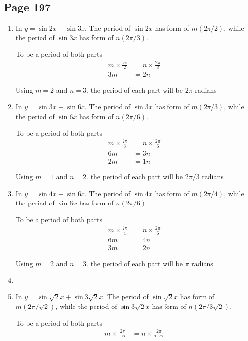 \documentclass{article}
\newenvironment{solutions}[1]
{\subsection*{#1}
 \begin{enumerate}[leftmargin=1.5em]}
{\end{enumerate}}
\newcommand{\solution}{\item}
\begin{document}
\begin{solutions}{Page 197}
\solution
In $y=\sin 2x + \sin 3x$. The period of $\sin 2x$ has form of $m(2\pi/2)$, while the period of $\sin 3x$ has form of $n(2\pi/3)$.

To be a period of both parts
\begin{align*}
    m\times \frac{2\pi}{2} &= n\times \frac{2\pi}{3}\\
                         3m  &= 2n
\end{align*}

Using $m=2$ and $n=3$. the period of each part will be $2\pi$ radians

\solution
In $y=\sin 3x + \sin 6x$. The period of $\sin 3x$ has form of $m(2\pi/3)$, while the period of $\sin 6x$ has form of $n(2\pi/6)$.

To be a period of both parts
\begin{align*}
    m\times \frac{2\pi}{3} &= n\times \frac{2\pi}{6}\\
                         6m  &= 3n\\
                         2m &= 1n
\end{align*}

Using $m=1$ and $n=2$. the period of each part will be $2\pi/3$ radians

\solution
In $y=\sin 4x + \sin 6x$. The period of $\sin 4x$ has form of $m(2\pi/4)$, while the period of $\sin 6x$ has form of $n(2\pi/6)$.

To be a period of both parts
\begin{align*}
    m\times \frac{2\pi}{4} &= n\times \frac{2\pi}{6}\\
                         6m  &= 4n\\
                         3m &= 2n
\end{align*}

Using $m=2$ and $n=3$. the period of each part will be $\pi$ radians

\solution
\solution
In $y=\sin \sqrt{2}x + \sin 3\sqrt{2}x$. The period of $\sin \sqrt{2}x$ has form of $m(2\pi/\sqrt{2})$, while the period of $\sin 3\sqrt{2}x$ has form of $n(2\pi/3\sqrt{2})$.

To be a period of both parts
\begin{align*}
    m\times \frac{2\pi}{\sqrt{2}} &= n\times \frac{2\pi}{3\sqrt{2}}\\
                         3m &= 1n
\end{align*}

Using $m=1$ and $n=3$. the period of each part will be $2\pi/\sqrt{2}= \sqrt{2}\pi$ radians
\end{solutions}
\end{document}
